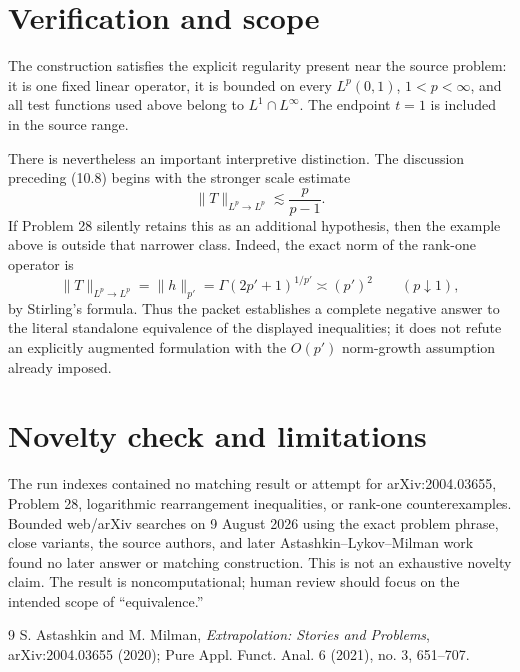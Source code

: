 \documentclass[11pt]{article}
\begin{document}
\section{Verification and scope}\label{sec:scope}

The construction satisfies the explicit regularity present near the source
problem: it is one fixed linear operator, it is bounded on every
$L^p(0,1)$, $1<p<\infty$, and all test functions used above belong to
$L^1\cap L^\infty$.  The endpoint $t=1$ is included in the source range.

There is nevertheless an important interpretive distinction.  The discussion
preceding (10.8) begins with the stronger scale estimate
\[
 \|T\|_{L^p\to L^p}\lesssim \frac{p}{p-1}.
\]
If Problem 28 silently retains this as an additional hypothesis, then the
example above is outside that narrower class.  Indeed, the exact norm of the
rank-one operator is
\[
 \|T\|_{L^p\to L^p}=\|h\|_{p'}
 =\Gamma(2p'+1)^{1/p'}\asymp (p')^2
 \qquad(p\downarrow1),
\]
by Stirling's formula.  Thus the packet establishes a complete negative
answer to the literal standalone equivalence of the displayed inequalities;
it does not refute an explicitly augmented formulation with the
$O(p')$ norm-growth assumption already imposed.

\section{Novelty check and limitations}

The run indexes contained no matching result or attempt for arXiv:2004.03655,
Problem 28, logarithmic rearrangement inequalities, or rank-one
counterexamples.  Bounded web/arXiv searches on 9 August 2026 using the exact
problem phrase, close variants, the source authors, and later
Astashkin--Lykov--Milman work found no later answer or matching construction.
This is not an exhaustive novelty claim.  The result is noncomputational;
human review should focus on the intended scope of ``equivalence.''

{\small
\begin{thebibliography}{9}
S. Astashkin and M. Milman,
\emph{Extrapolation: Stories and Problems},
arXiv:2004.03655 (2020); Pure Appl. Funct. Anal. 6 (2021), no. 3, 651--707.
\end{thebibliography}
}
\end{document}
